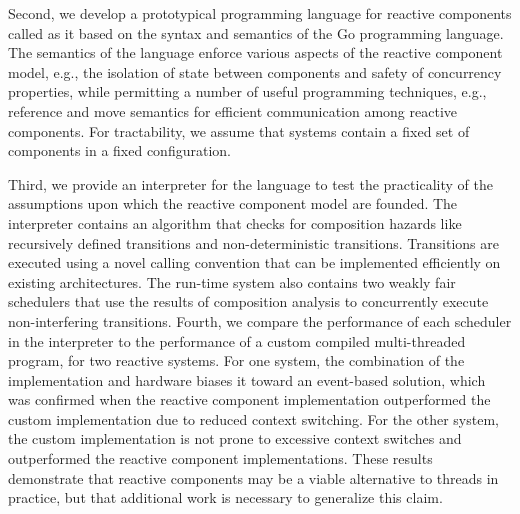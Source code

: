 Second, we develop a prototypical programming language for reactive components called \emph{\rcgo{}} as it based on the syntax and semantics of the Go programming language.
The semantics of the \rcgo{} language enforce various aspects of the reactive component model, e.g., the isolation of state between components and safety of concurrency properties, while permitting a number of useful programming techniques, e.g., reference and move semantics for efficient communication among reactive components.
For tractability, we assume that systems contain a fixed set of components in a fixed configuration.

Third, we provide an interpreter for the \rcgo{} language to test the practicality of the assumptions upon which the reactive component model are founded.
The interpreter contains an algorithm that checks for composition hazards like recursively defined transitions and non-deterministic transitions.
Transitions are executed using a novel calling convention that can be implemented efficiently on existing architectures.
The run-time system also contains two weakly fair schedulers that use the results of composition analysis to concurrently execute non-interfering transitions.
Fourth, we compare the performance of each scheduler in the interpreter to the performance of a custom compiled multi-threaded program, for two reactive systems.
For one system, the combination of the implementation and hardware biases it toward an event-based solution, which was confirmed when the reactive component implementation outperformed the custom implementation due to reduced context switching.
For the other system, the custom implementation is not prone to excessive context switches and outperformed the reactive component implementations.
These results demonstrate that reactive components may be a viable alternative to threads in practice, but that additional work is necessary to generalize this claim.
